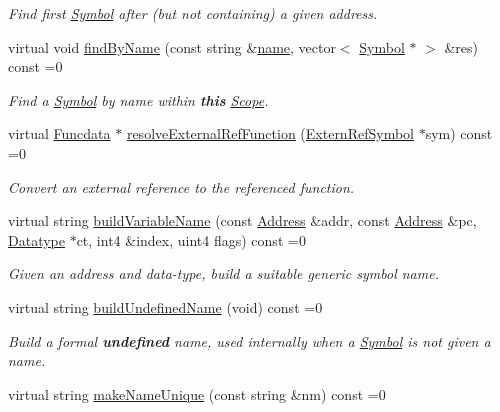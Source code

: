 \begin{DoxyCompactItemize}
\begin{DoxyCompactList}\small\item\em Find first \mbox{\hyperlink{class_symbol}{Symbol}} after (but not containing) a given address. \end{DoxyCompactList}\item 
virtual void \mbox{\hyperlink{class_scope_a979222d28577e6e8d07e35f12d38bff7}{find\+By\+Name}} (const string \&\mbox{\hyperlink{class_scope_abb4900f6409e8a82c1b1cea827e4e2c5}{name}}, vector$<$ \mbox{\hyperlink{class_symbol}{Symbol}} $\ast$ $>$ \&res) const =0
\begin{DoxyCompactList}\small\item\em Find a \mbox{\hyperlink{class_symbol}{Symbol}} by name within {\bfseries{this}} \mbox{\hyperlink{class_scope}{Scope}}. \end{DoxyCompactList}\item 
virtual \mbox{\hyperlink{class_funcdata}{Funcdata}} $\ast$ \mbox{\hyperlink{class_scope_af4c45025894f1996ef0f3556752cd997}{resolve\+External\+Ref\+Function}} (\mbox{\hyperlink{class_extern_ref_symbol}{Extern\+Ref\+Symbol}} $\ast$sym) const =0
\begin{DoxyCompactList}\small\item\em Convert an {\itshape external} {\itshape reference} to the referenced function. \end{DoxyCompactList}\item 
virtual string \mbox{\hyperlink{class_scope_a925baecb33b6f0d9212e42c1b48a64ba}{build\+Variable\+Name}} (const \mbox{\hyperlink{class_address}{Address}} \&addr, const \mbox{\hyperlink{class_address}{Address}} \&pc, \mbox{\hyperlink{class_datatype}{Datatype}} $\ast$ct, int4 \&index, uint4 flags) const =0
\begin{DoxyCompactList}\small\item\em Given an address and data-\/type, build a suitable generic symbol name. \end{DoxyCompactList}\item 
virtual string \mbox{\hyperlink{class_scope_ac47d5c1c949be84a27a138be0febacb2}{build\+Undefined\+Name}} (void) const =0
\begin{DoxyCompactList}\small\item\em Build a formal {\bfseries{undefined}} name, used internally when a \mbox{\hyperlink{class_symbol}{Symbol}} is not given a name. \end{DoxyCompactList}\item 
virtual string \mbox{\hyperlink{class_scope_a2e0d945c44f4874743496b2814fbb631}{make\+Name\+Unique}} (const string \&nm) const =0

\end{DoxyCompactItemize}
